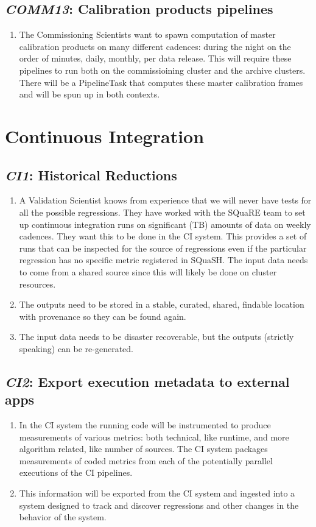 \documentclass[DM,toc,lsstdraft]{lsstdoc}
\newcommand{\usecase}[3]{%
\subsection{\emph{#1}: #2}
\label{use:#1}
\begin{enumerate}[label=\alph*.]
#3
\end{enumerate}
}
\begin{document}
\usecase{COMM13}{Calibration products pipelines}{%

\item
The Commissioning Scientists want to spawn computation of master calibration products on many different cadences: during the night on the order of minutes, daily, monthly, per data release.
This will require these pipelines to run both on the commissioining cluster and the archive clusters.
There will be a PipelineTask that computes these master calibration frames and will be spun up in both contexts.

}

\section{Continuous Integration}

\usecase{CI1}{Historical Reductions}{%

\item
A Validation Scientist knows from experience that we will never have tests for all the possible regressions.
They have worked with the SQuaRE team to set up continuous integration runs on significant (TB) amounts of data on weekly cadences.
They want this to be done in the CI system.
This provides a set of runs that can be inspected for the source of regressions even if the particular regression has no specific metric registered in SQuaSH.
The input data needs to come from a shared source since this will likely be done on cluster resources.

\item
The outputs need to be stored in a stable, curated, shared, findable location with provenance so they can be found again.

\item
The input data needs to be disaster recoverable, but the outputs (strictly speaking) can be re-generated.

}

\usecase{CI2}{Export execution metadata to external apps}{%

\item
In the CI system the running code will be instrumented to produce measurements of various metrics: both technical, like runtime, and more algorithm related, like number of sources.
The CI system packages measurements of coded metrics from each of the potentially parallel executions of the CI pipelines.

\item
This information will be exported from the CI system and ingested into a system designed to track and discover regressions and other changes in the behavior of the system.

}
\end{document}
